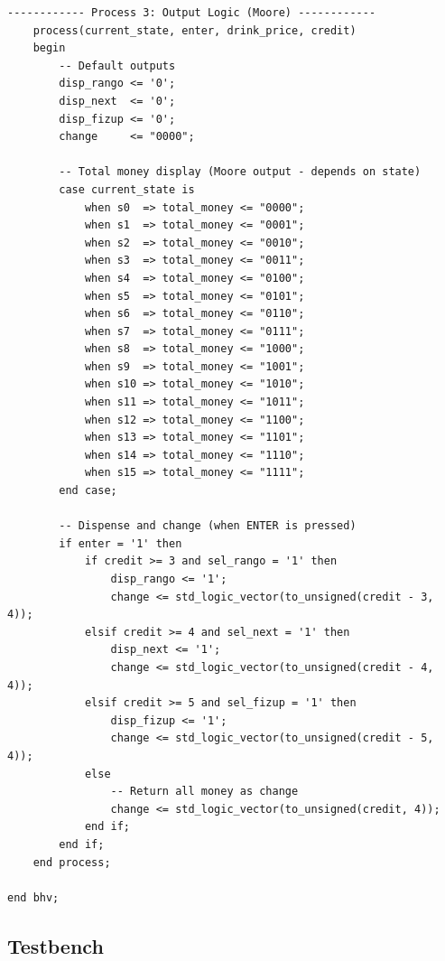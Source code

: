 \documentclass[12pt,a4paper]{article}
\begin{document}
\begin{lstlisting}[caption={vending\_machine.vhd}]
    ------------ Process 3: Output Logic (Moore) ------------
    process(current_state, enter, drink_price, credit)
    begin
        -- Default outputs
        disp_rango <= '0';
        disp_next  <= '0';
        disp_fizup <= '0';
        change     <= "0000";
        
        -- Total money display (Moore output - depends on state)
        case current_state is
            when s0  => total_money <= "0000";
            when s1  => total_money <= "0001";
            when s2  => total_money <= "0010";
            when s3  => total_money <= "0011";
            when s4  => total_money <= "0100";
            when s5  => total_money <= "0101";
            when s6  => total_money <= "0110";
            when s7  => total_money <= "0111";
            when s8  => total_money <= "1000";
            when s9  => total_money <= "1001";
            when s10 => total_money <= "1010";
            when s11 => total_money <= "1011";
            when s12 => total_money <= "1100";
            when s13 => total_money <= "1101";
            when s14 => total_money <= "1110";
            when s15 => total_money <= "1111";
        end case;
        
        -- Dispense and change (when ENTER is pressed)
        if enter = '1' then
            if credit >= 3 and sel_rango = '1' then
                disp_rango <= '1';
                change <= std_logic_vector(to_unsigned(credit - 3, 4));
            elsif credit >= 4 and sel_next = '1' then
                disp_next <= '1';
                change <= std_logic_vector(to_unsigned(credit - 4, 4));
            elsif credit >= 5 and sel_fizup = '1' then
                disp_fizup <= '1';
                change <= std_logic_vector(to_unsigned(credit - 5, 4));
            else
                -- Return all money as change
                change <= std_logic_vector(to_unsigned(credit, 4));
            end if;
        end if;
    end process;

end bhv;
\end{lstlisting}

\newpage
\subsection{Testbench}
\end{document}
